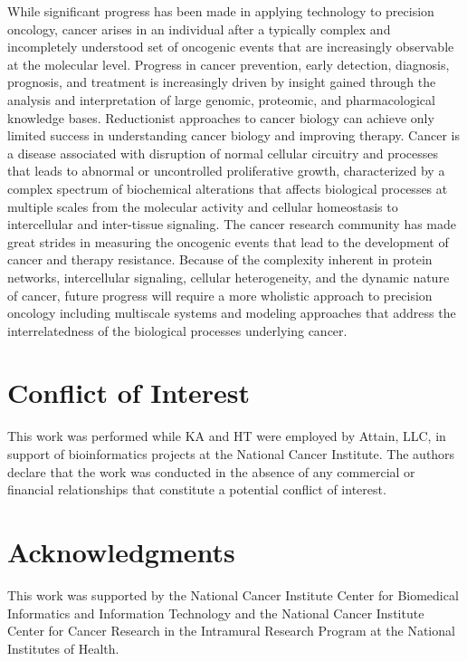 \documentclass{article}
\begin{document}
While significant progress has been made in applying technology to
precision oncology, cancer arises in an individual after a typically complex and
incompletely understood set of oncogenic events that are increasingly
observable at the molecular level. Progress in cancer prevention,
early detection, diagnosis, prognosis, and treatment is increasingly
driven by insight gained through the analysis and interpretation of
large genomic, proteomic, and pharmacological knowledge
bases. Reductionist approaches to cancer biology can achieve only
limited success in understanding cancer biology and improving
therapy. Cancer is a disease associated with disruption of normal
cellular circuitry and processes that leads to abnormal or
uncontrolled proliferative growth, characterized by a complex spectrum
of biochemical alterations that affects biological processes at
multiple scales from the molecular activity and cellular homeostasis
to intercellular and inter-tissue signaling. The cancer research
community has made great strides in measuring the oncogenic events
that lead to the development of cancer and therapy
resistance. Because of the complexity inherent in
protein networks, intercellular signaling, cellular heterogeneity, and
the dynamic nature of cancer, future progress will require a more
wholistic approach to precision oncology including multiscale systems and modeling
approaches that address the interrelatedness of the biological
processes underlying cancer.

\section{Conflict of Interest}

This work was performed while KA and HT were employed by Attain, LLC,
in support of bioinformatics projects at the National Cancer
Institute. The authors declare that the work was conducted in the
absence of any commercial or financial relationships that constitute a
potential conflict of interest.

\section{Acknowledgments}
This work was supported by the National Cancer Institute Center for
Biomedical Informatics and Information Technology and the National
Cancer Institute Center for Cancer Research in the Intramural Research
Program at the National Institutes of Health. 

\printbibliography
\end{document}

